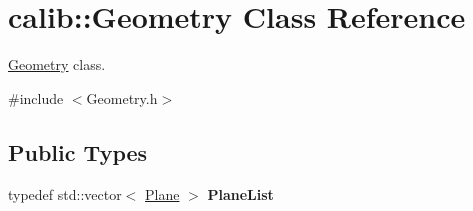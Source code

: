 \hypertarget{classcalib_1_1Geometry}{\section{calib\-:\-:Geometry Class Reference}
\label{classcalib_1_1Geometry}
}


\hyperlink{classcalib_1_1Geometry}{Geometry} class.  




{\ttfamily \#include $<$Geometry.\-h$>$}

\subsection*{Public Types}
\begin{DoxyCompactItemize}
\item 
\hypertarget{classcalib_1_1Geometry_a85d1d4140e153e7d0e423208954107aa}{typedef std\-::vector$<$ \hyperlink{classcalib_1_1Plane}{Plane} $>$ {\bfseries Plane\-List}}\label{classcalib_1_1Geometry_a85d1d4140e153e7d0e423208954107aa}

\end{DoxyCompactItemize}
